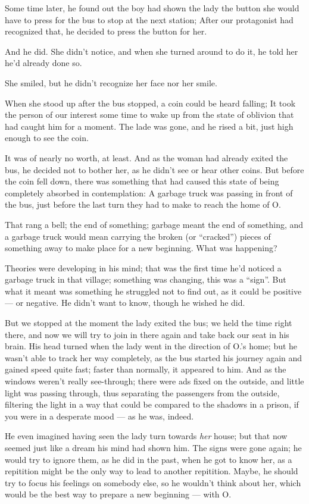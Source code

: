 Some time later, he found out the boy had shown the lady the button she would have to press for the bus to stop at the next station; After our protagonist had recognized that, he decided to press the button for her.

And he did. 
She didn't notice, and when she turned around to do it, he told her he'd already done so.

She smiled, but he didn't recognize her face nor her smile.

When she stood up after the bus stopped, a coin could be heard falling; It took the person of our interest some time to wake up from the state of oblivion that had caught him for a moment. The lade was gone, and he rised a bit, just high enough to see the coin.

It was of nearly no worth, at least. And as the woman had already exited the bus, he decided not to bother her, as he didn't see or hear other coins. 
But before the coin fell down, there was something that had caused this state of being completely absorbed in contemplation: A garbage truck was passing in front of the bus, just before the last turn they had to make to reach the home of O.

That rang a bell; the end of something; garbage meant the end of something, and a garbage truck would mean carrying the broken (or \enquote{cracked}) pieces of something away to make place for a new beginning. 
What was happening?

Theories were developing in his mind; that was the first time he'd noticed a garbage truck in that village; something was changing, this was a \enquote{sign}. 
But what it meant was something he struggled not to find out, as it could be positive --- or negative. 
He didn't want to know, though he wished he did.

But we stopped at the moment the lady exited the bus; we held the time right there, and now we will try to join in there again and take back our seat in his brain. 
His head turned when the lady went in the direction of O.'s home; but he wasn't able to track her way completely, as the bus started his journey again and gained speed quite fast; faster than normally, it appeared to him. And as the windows weren't really see-through; there were ads fixed on the outside, and little light was passing through, thus separating the passengers from the outside, filtering the light in a way that could be compared to the shadows in a prison, if you were in a desperate mood --- as he was, indeed.

He even imagined having seen the lady turn towards \emph{her} house; but that now seemed just like a dream his mind had shown him. 
The signs were gone again; he would try to ignore them, as he did in the past, when he got to know her, as a repitition might be the only way to lead to another repitition. Maybe, he should try to focus his feelings on somebody else, so he wouldn't think about her, which would be the best way to prepare a new beginning --- with O.


